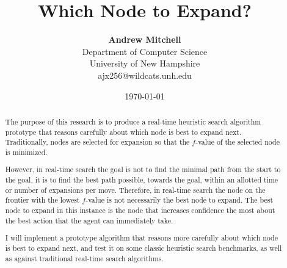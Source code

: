 \documentclass[letterpaper, 11 pt, conference]{ieeeconf}  %
\title{\LARGE \bf
	Which Node to Expand?
}
\author{ {\bf Andrew Mitchell}  \\
	Department of Computer Science \\
	University of New Hampshire\\
	{\small ajx256@wildcats.unh.edu}
}
\date{\today}
\begin{document}
\maketitle
\thispagestyle{empty}
\pagestyle{empty}


\begin{abstract}

The purpose of this research is to produce a real-time heuristic search algorithm prototype that reasons carefully about which node is best to expand next. Traditionally, nodes are selected for expansion so that the $f$-value of the selected node is minimized.

However, in real-time search the goal is not to find the minimal path from the start to the goal, it is to find the best path possible, towards the goal, within an allotted time or number of expansions per move. Therefore, in real-time search the node on the frontier with the lowest $f$-value is not necessarily the best node to expand. The best node to expand in this instance is the node that increases confidence the most about the best action that the agent can immediately take. 

I will implement a prototype algorithm that reasons more carefully about which node is best to expand next, and test it on some classic heuristic search benchmarks, as well as against traditional real-time search algorithms.
\end{abstract}
\end{document}
